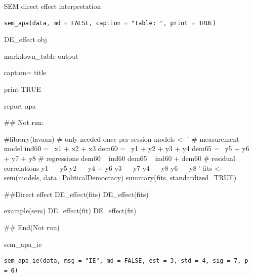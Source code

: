 \documentclass[a4paper]{book}
\begin{document}
%
\begin{Description}
SEM direct effect interpretation
\end{Description}
%
\begin{Usage}
\begin{verbatim}
sem_apa(data, md = FALSE, caption = "Table: ", print = TRUE)
\end{verbatim}
\end{Usage}
%
\begin{Arguments}
\begin{ldescription}
\item[\code{data}] DE\_effect obj

\item[\code{md}] markdown\_table output

\item[\code{caption}] caption= title

\item[\code{print}] print TRUE
\end{ldescription}
\end{Arguments}
%
\begin{Value}
report apa
\end{Value}
%
\begin{Examples}
\begin{ExampleCode}

## Not run: 

 #library(lavaan) # only needed once per session
 models <- '
   # measurement model
     ind60 =~ x1 + x2 + x3
     dem60 =~ y1 + y2 + y3 + y4
     dem65 =~ y5 + y6 + y7 + y8
 # regressions
     dem60 ~ ind60
     dem65 ~ ind60 + dem60
   # residual correlations
     y1 ~~ y5
     y2 ~~ y4 + y6
     y3 ~~ y7
     y4 ~~ y8
    y6 ~~ y8
 '
 fits <- sem(models, data=PoliticalDemocracy)
 summary(fits, standardized=TRUE)

 ##Direct effect
 DE_effect(fits)
 DE_effect(fits)%

example(sem)
DE_effect(fit)
DE_effect(fit) %


## End(Not run)

\end{ExampleCode}
\end{Examples}
%
\begin{Description}
sem\_apa\_ie
\end{Description}
%
\begin{Usage}
\begin{verbatim}
sem_apa_ie(data, msg = "IE", md = FALSE, est = 3, std = 4, sig = 7, p = 6)
\end{verbatim}
\end{Usage}
\end{document}
